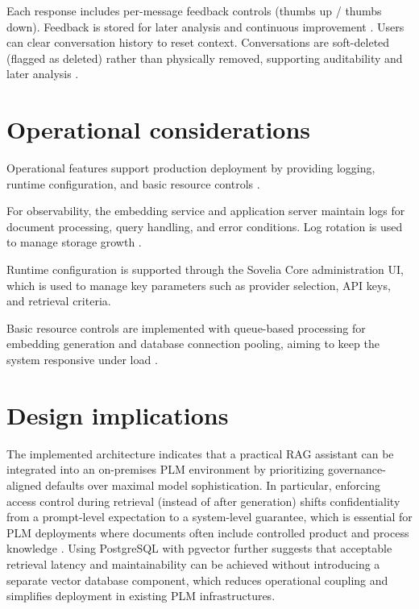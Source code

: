 Each response includes per-message feedback controls (thumbs up / thumbs down). Feedback is stored for later analysis and continuous improvement \parencite{petricekAIAssistantsFramework2023, knollmeyerDocumentGraphRAGKnowledge2025}. Users can clear conversation history to reset context. Conversations are soft-deleted (flagged as deleted) rather than physically removed, supporting auditability and later analysis \parencite{budiu6TypesConversations2023}.

\section{Operational considerations}
\label{sec:operational-considerations}

Operational features support production deployment by providing logging, runtime configuration, and basic resource controls \parencite{KimothiAbhinav2025ASGt}.

For observability, the embedding service and application server maintain logs for document processing, query handling, and error conditions. Log rotation is used to manage storage growth \parencite{KimothiAbhinav2025ASGt}.

Runtime configuration is supported through the Sovelia Core administration UI, which is used to manage key parameters such as provider selection, API keys, and retrieval criteria.

Basic resource controls are implemented with queue-based processing for embedding generation and database connection pooling, aiming to keep the system responsive under load \parencite{KimothiAbhinav2025ASGt}.

\section{Design implications}
\label{sec:system-design-implications}

The implemented architecture indicates that a practical RAG assistant can be integrated into an on-premises PLM environment by prioritizing governance-aligned defaults over maximal model sophistication. In particular, enforcing access control during retrieval (instead of after generation) shifts confidentiality from a prompt-level expectation to a system-level guarantee, which is essential for PLM deployments where documents often include controlled product and process knowledge \parencite{jeongPermissionAwareRAGIdentity2025, zhongHoneyBeeEfficientRolebased2025}. Using PostgreSQL with pgvector further suggests that acceptable retrieval latency and maintainability can be achieved without introducing a separate vector database component, which reduces operational coupling and simplifies deployment in existing PLM infrastructures.

